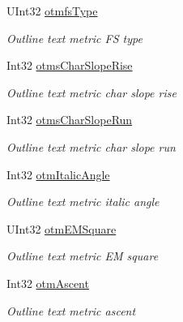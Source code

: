 \begin{DoxyCompactItemize}
U\+Int32 \hyperlink{class_pdf_file_writer_1_1_win_outline_text_metric_a3d3c57160f70e4b3155f1d4f8d441e43}{otmfs\+Type}
\begin{DoxyCompactList}\small\item\em Outline text metric FS type \end{DoxyCompactList}\item 
Int32 \hyperlink{class_pdf_file_writer_1_1_win_outline_text_metric_a4e5a836a0b9cc2cd2b85010bb867e358}{otms\+Char\+Slope\+Rise}
\begin{DoxyCompactList}\small\item\em Outline text metric char slope rise \end{DoxyCompactList}\item 
Int32 \hyperlink{class_pdf_file_writer_1_1_win_outline_text_metric_a040e8003bfc0aa6badae6b7a34a400d8}{otms\+Char\+Slope\+Run}
\begin{DoxyCompactList}\small\item\em Outline text metric char slope run \end{DoxyCompactList}\item 
Int32 \hyperlink{class_pdf_file_writer_1_1_win_outline_text_metric_ac5a72a736b130a724ceec5af05b96e97}{otm\+Italic\+Angle}
\begin{DoxyCompactList}\small\item\em Outline text metric italic angle \end{DoxyCompactList}\item 
U\+Int32 \hyperlink{class_pdf_file_writer_1_1_win_outline_text_metric_ade1240a0288d003931770cc1eca16733}{otm\+E\+M\+Square}
\begin{DoxyCompactList}\small\item\em Outline text metric EM square \end{DoxyCompactList}\item 
Int32 \hyperlink{class_pdf_file_writer_1_1_win_outline_text_metric_a361509c9f2da22866a958b85a864ac7e}{otm\+Ascent}
\begin{DoxyCompactList}\small\item\em Outline text metric ascent \end{DoxyCompactList}\item 

\end{DoxyCompactItemize}
